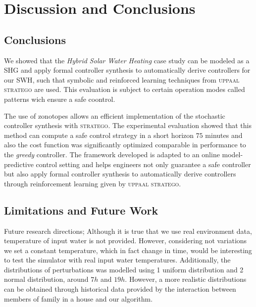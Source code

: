 \chapter{Discussion and Conclusions}
\label{ch:conclusions}

\section{Conclusions}
\label{sec:conclusions}
We showed that the \emph{Hybrid Solar Water Heating} case study can 
be modeled as a \ac{SHG} and apply formal 
controller synthesis to automatically derive controllers 
for our \ac{SWH}, such that symbolic and reinforced learning 
techniques from \textsc{uppaal stratego} are used. This evaluation 
is subject to certain operation modes called patterns wich ensure 
a safe coontrol.

The use of zonotopes allows an efficient implementation of the 
stochastic controller synthesis with \textsc{stratego}. The experimental
 evaluation showed that this method can compute a safe control strategy 
 in a short horizon $75$ minutes and also the cost function was 
 significantly optimized comparable in performance to the \emph{greedy} 
 controller. The  framework developed is adapted to an online 
 model-predictive control setting and helps engineers not only guarantee 
 a  safe controller  but also apply formal controller synthesis to 
 automatically derive controllers through reinforcement learning given
by \textsc{uppaal stratego}.

\section{Limitations and Future Work}
\label{sec:limitations}

Future research directions; Although it is true that we use
real environment data, temperature of input water is not provided. However,
considering not variations we set a constant temperature, which in fact 
change in time, would be interesting to test the simulator with real 
input water temperatures. Additionally, the distributions of perturbations
was modelled using 1 uniform distribution and 2 normal distribution, 
around $7h$ and $19h$. However, a more realistic distributions can be 
obtained through historical data provided by the interaction
between members of family in a house and our algorithm.


